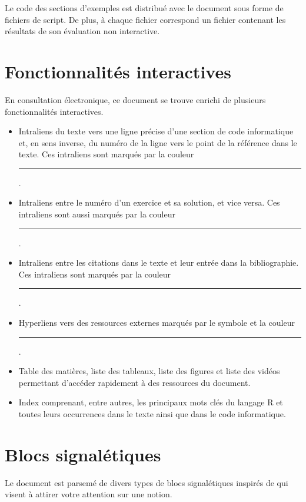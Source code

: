 Le code des sections d'exemples est distribué avec le document sous
forme de fichiers de script. De plus, à chaque fichier 
correspond un fichier  contenant les résultats de son
évaluation non interactive.


\section*{Fonctionnalités interactives}

En consultation électronique, ce document se trouve enrichi de
plusieurs fonctionnalités interactives.
\begin{itemize}
\item Intraliens du texte vers une ligne précise d'une section de code
  informatique et, en sens inverse, du numéro de la ligne vers le
  point de la référence dans le texte. Ces intraliens sont marqués par
  la couleur \textcolor{link}{\rule{1.5em}{1.2ex}}.
\item Intraliens entre le numéro d'un exercice et sa solution, et vice
  versa. Ces intraliens sont aussi marqués par la couleur
  \textcolor{link}{\rule{1.5em}{1.2ex}}.
\item Intraliens entre les citations dans le texte et leur entrée dans
  la bibliographie. Ces intraliens sont marqués par la couleur
  \textcolor{citation}{\rule{1.5em}{1.2ex}}.
\item Hyperliens vers des ressources externes marqués par le symbole
  {\smaller\faExternalLink*} et la couleur
  \textcolor{url}{\rule{1.5em}{1.2ex}}.
\item Table des matières, liste des tableaux, liste des figures et
  liste des vidéos permettant d'accéder rapidement à des ressources du
  document.
\item Index comprenant, entre autres, les principaux mots clés du
  langage R et toutes leurs occurrences dans le texte ainsi que
  dans le code informatique.
\end{itemize}

\section*{Blocs signalétiques}

Le document est parsemé de divers types de blocs signalétiques
inspirés de
qui visent à attirer votre attention sur une notion.

\vspace{-\baselineskip}

